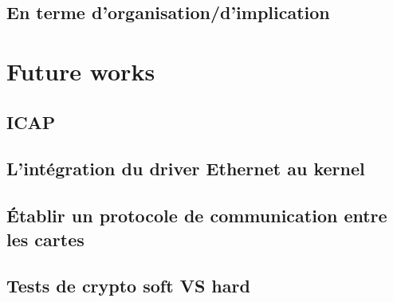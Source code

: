 \documentclass[a4paper]{report}
\begin{document}
\subsection{En terme d'organisation/d'implication}


\section{Future works}

\subsection{ICAP}


\subsection{L'intégration du driver Ethernet au kernel}


\subsection{Établir un protocole de communication entre les cartes}


\subsection{Tests de crypto soft VS hard}








\end{document}
